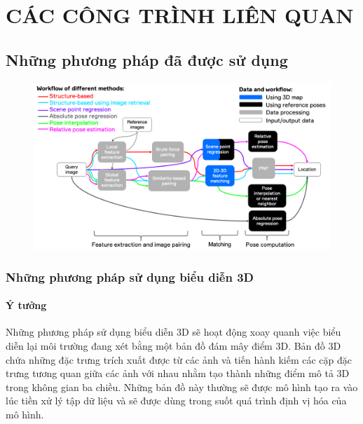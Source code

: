 \chapter{CÁC CÔNG TRÌNH LIÊN QUAN}

\section{Những phương pháp đã được sử dụng}


\begin{figure}[H]
    \centering
    \includegraphics[scale=0.45]{pics/Chapter2/overviewViLoc.png}
\end{figure}

\subsection{Những phương pháp sử dụng biểu diễn 3D}
\subsubsection*{Ý tưởng}
Những phương pháp sử dụng biểu diễn 3D sẽ hoạt động xoay quanh việc biểu diễn lại môi trường đang xét bằng một bản đồ đám mây điểm 3D. Bản đồ 3D chứa những đặc trưng trích xuất được từ các ảnh và tiến hành kiếm các cặp đặc trưng tương quan giữa các ảnh với nhau nhằm tạo thành những điểm mô tả 3D trong không gian ba chiều. Những bản đồ này thường sẽ được mô hình tạo ra vào lúc tiền xử lý tập dữ liệu và sẽ được dùng trong suốt quá trình định vị hóa của mô hình.
